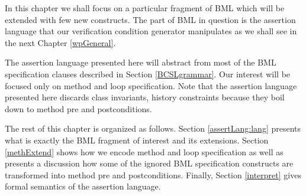 In this chapter we shall focus on 
 a particular fragment of BML which will be extended with 
few new constructs.  The part of BML in question  
is the assertion language that our  verification condition generator manipulates
 as we shall see in the next Chapter \ref{wpGeneral}.



The assertion language presented here will abstract from most of the BML specification clauses described in Section \ref{BCSLgrammar}.
Our interest will be focused only on method and loop specification.
Note that  the assertion language presented here discards class invariants,
 history constraints  because  they boil down to method pre and postconditions. 


The rest of this chapter is organized as follows. Section \ref{assertLang:lang} presents
what is exactly the BML fragment of interest and its extensions.
Section \ref{methExtend} shows how we encode method and loop specification as well as presents a discussion
how some of the ignored BML specification constructs are transformed into method pre and postconditions.
Finally, Section \ref{interpret} gives formal semantics of the assertion language.

